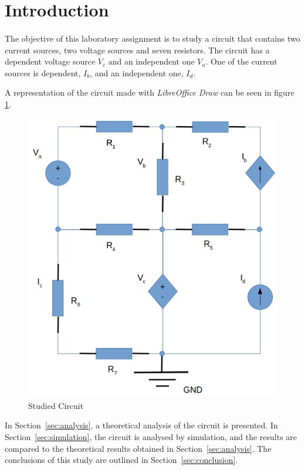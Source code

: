 \section{Introduction}
\label{sec:introduction}
\paragraph{}
\par The objective of this laboratory assignment is to study a circuit that contains two current sources, two voltage sources and seven resistors. The circuit has a dependent voltage source $V_c$ and an independent one $V_a$. One of the current sources is dependent, $I_b$, and an independent one, $I_d$. 
\par A representation of the circuit made with \textit{LibreOffice Draw} can be seen in figure \ref{circuit}.

\begin{figure}[H]
    \includegraphics[width=0.4\linewidth]{Circuito.png}
    \centering
    \caption{Studied Circuit}
    \label{circuit}
\end{figure}

In Section~\ref{sec:analysis}, a theoretical analysis of the circuit is
presented. In Section~\ref{sec:simulation}, the circuit is analysed by
simulation, and the results are compared to the theoretical results obtained in
Section~\ref{sec:analysis}. The conclusions of this study are outlined in
Section~\ref{sec:conclusion}.

